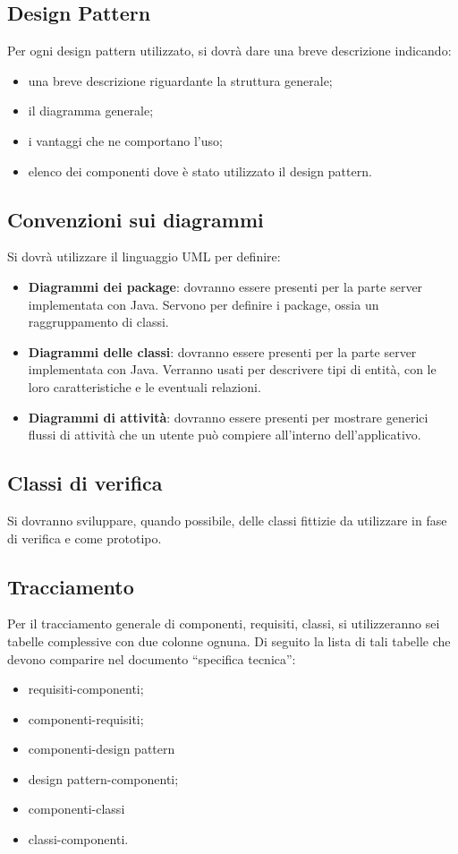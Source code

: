 {\subsection{Design Pattern}
\label{sec:design_patterns}
Per ogni design pattern utilizzato, si dovrà dare una breve descrizione indicando:
\begin{itemize}
\item una breve descrizione riguardante la struttura generale;
\item il diagramma generale;
\item i vantaggi che ne comportano l'uso;
\item elenco dei componenti dove è stato utilizzato il design pattern.
\end{itemize}

\subsection{Convenzioni sui diagrammi}
Si dovrà utilizzare il linguaggio UML per definire:
\begin{itemize}

\item \textbf{Diagrammi dei package}: dovranno essere presenti per la parte server implementata con Java. Servono per definire i package, ossia un raggruppamento di classi.
\item \textbf{Diagrammi delle classi}: dovranno essere presenti per la parte server implementata con Java. Verranno usati per descrivere tipi di entità, con le loro caratteristiche e le eventuali relazioni.
\item \textbf{Diagrammi di attività}: dovranno essere presenti per mostrare generici flussi di attività che un utente può compiere all'interno dell'applicativo.
\end{itemize}

\subsection{Classi di verifica}
Si dovranno sviluppare, quando possibile, delle classi fittizie da utilizzare in fase di verifica e come prototipo.

\subsection{Tracciamento}
\label{sec:tracciamenti_progettazione}
Per il tracciamento generale di componenti, requisiti, classi, si utilizzeranno sei tabelle complessive con due colonne ognuna. Di seguito la lista di tali tabelle che devono comparire nel documento ``specifica tecnica'':
\begin{itemize}
\item requisiti-componenti;
\item componenti-requisiti;
\item componenti-design pattern
\item design pattern-componenti;
\item componenti-classi
\item classi-componenti.
\end{itemize} 
}
